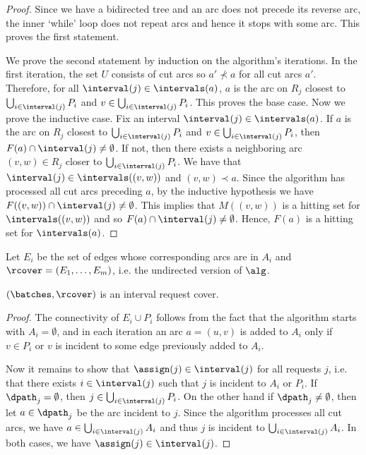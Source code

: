 \begin{proof}
  Since we have a bidirected tree and an arc does not precede its
  reverse arc, the inner `while' loop does not repeat arcs and hence it stops with
  some arc. This proves the first statement.


  We prove the second statement by induction on the algorithm's
  iterations. In the first iteration, the set $U$ consists of cut arcs
  so $a' \nprec a$ for all cut arcs $a'$. Therefore, for all
  $\interval(j) \in \intervals(a)$, $a$ is the arc on $R_j$ closest to
  $\bigcup_{i \in \interval(j)} P_i$ and $v \in \bigcup_{i \in
    \interval(j)} P_i$. This proves the base case. Now we prove the
  inductive case.
Fix an interval $\interval(j) \in \intervals(a)$. If $a$ is the arc
  on $R_j$ closest to $\bigcup_{i \in \interval(j)} P_i$ and $v \in
  \bigcup_{i \in \interval(j)} P_i$, then $F(a) \cap \interval(j) \neq
  \emptyset$. If not, then there exists a neighboring arc $(v,w) \in
  R_j$ closer to $\bigcup_{i \in \interval(j)} P_i$. We have that
  $\interval(j) \in \intervals((v,w))$ and $(v,w) \prec a$. Since the
  algorithm has processed all cut arcs preceding $a$, by the inductive
  hypothesis we have $F((v,w)) \cap \interval(j) \neq \emptyset$. This
  implies that $M((v,w))$ is a hitting set for $\intervals((v,w))$ and
  so $F(a) \cap \interval(j) \neq \emptyset$.
  Hence, $F(a)$ is a hitting set for $\intervals(a)$.  \end{proof}



Let $E_i$ be the set of edges whose corresponding arcs are in $A_i$
and $\rcover = (E_1, \ldots, E_m)$, i.e. the undirected version of
$\alg$.
\begin{lemma}
  \label{lem:connected}
  $(\batches, \rcover)$ is an interval request cover.
\end{lemma}

\begin{proof}
The connectivity of $E_i \cup P_i$ follows from the fact that the
  algorithm starts with $A_i = \emptyset$, and in each iteration an
  arc $a = (u,v)$ is added to $A_i$ only if $v \in P_i$ or $v$ is
  incident to some edge previously added to $A_i$.

  Now it remains to show that $\assign(j) \in \interval(j)$ for all
  requests $j$, i.e. that there exists $i \in \interval(j)$ such that
  $j$ is incident to $A_i$ or $P_i$. If $\dpath_j = \emptyset$, then
  $j \in \bigcup_{i \in \interval(j)} P_i$. On the other hand if
  $\dpath_j \neq \emptyset$, then let $a \in \dpath_j$ be the arc
  incident to $j$. Since the algorithm processes all cut arcs, we have $a \in
  \bigcup_{i \in \interval(j)} A_i$ and thus $j$ is incident to
  $\bigcup_{i \in \interval(j)}A_i$. In both cases, we have
  $\assign(j) \in \interval(j)$.  \end{proof}

